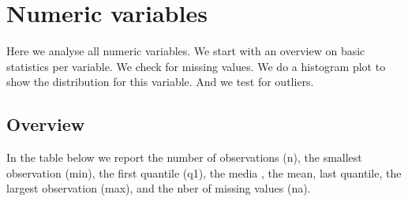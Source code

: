\documentclass[10pt,a4paper,titlepage]{report}
\begin{document}
\section{Numeric variables}
Here we analyse all numeric variables. We start with an overview on basic statistics per variable. We check for missing values. We do a histogram plot to show the distribution for this variable. And we test for outliers.

\subsection{Overview}
In the table below we report the number of observations (n), the smallest observation (min),  the first quantile (q1), the media ,  the mean, last quantile, the largest observation (max), and the nber of missing values (na).\\
\end{document}

